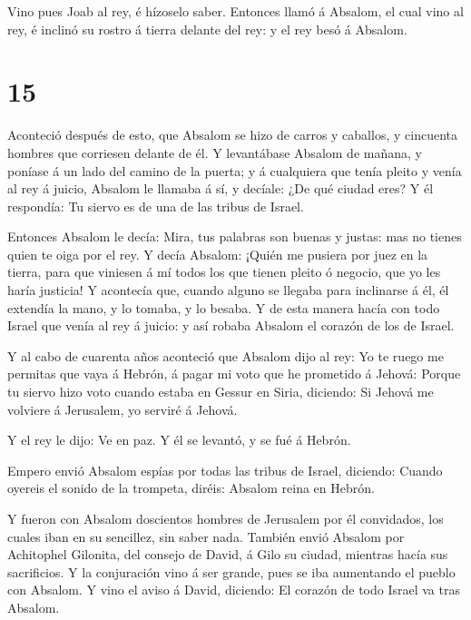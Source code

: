  Vino pues Joab al rey, é hízoselo saber. Entonces llamó á
Absalom, el cual vino al rey, é inclinó su rostro á tierra delante del
rey: y el rey besó á Absalom.

\hypertarget{section-14}{%
\section{15}\label{section-14}}

 Aconteció después de esto, que Absalom se hizo de carros y
caballos, y cincuenta hombres que corriesen delante de él. 
Y levantábase Absalom de mañana, y poníase á un lado del camino de la
puerta; y á cualquiera que tenía pleito y venía al rey á juicio, Absalom
le llamaba á sí, y decíale: ¿De qué ciudad eres? Y él respondía: Tu
siervo es de una de las tribus de Israel.

 Entonces Absalom le decía: Mira, tus palabras son buenas y
justas: mas no tienes quien te oiga por el rey.  Y decía
Absalom: ¡Quién me pusiera por juez en la tierra, para que viniesen á mí
todos los que tienen pleito ó negocio, que yo les haría justicia!
 Y acontecía que, cuando alguno se llegaba para inclinarse á
él, él extendía la mano, y lo tomaba, y lo besaba.  Y de
esta manera hacía con todo Israel que venía al rey á juicio: y así
robaba Absalom el corazón de los de Israel.

 Y al cabo de cuarenta años aconteció que Absalom dijo al
rey: Yo te ruego me permitas que vaya á Hebrón, á pagar mi voto que he
prometido á Jehová:  Porque tu siervo hizo voto cuando
estaba en Gessur en Siria, diciendo: Si Jehová me volviere á Jerusalem,
yo serviré á Jehová.

 Y el rey le dijo: Ve en paz. Y él se levantó, y se fué á
Hebrón.

 Empero envió Absalom espías por todas las tribus de
Israel, diciendo: Cuando oyereis el sonido de la trompeta, diréis:
Absalom reina en Hebrón.

 Y fueron con Absalom doscientos hombres de Jerusalem por
él convidados, los cuales iban en su sencillez, sin saber nada.
 También envió Absalom por Achitophel Gilonita, del consejo
de David, á Gilo su ciudad, mientras hacía sus sacrificios. Y la
conjuración vino á ser grande, pues se iba aumentando el pueblo con
Absalom.  Y vino el aviso á David, diciendo: El corazón de
todo Israel va tras Absalom.

